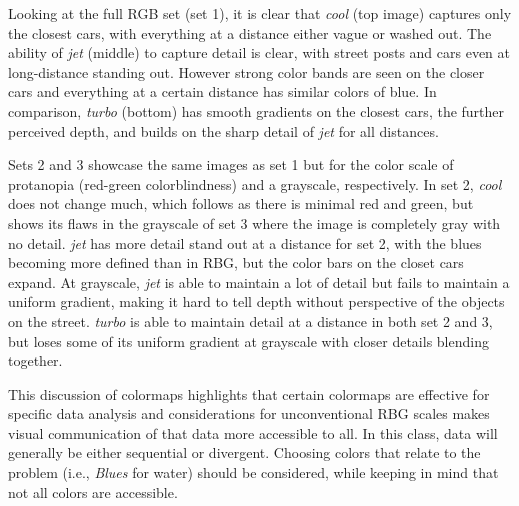 Looking at the full RGB set (set 1), it is clear that \textit{cool} (top image) captures only the closest cars, with everything at a distance either vague or washed out. The ability of \textit{jet} (middle) to capture detail is clear, with street posts and cars even at long-distance standing out. However strong color bands are seen on the closer cars and everything at a certain distance has similar colors of blue.  In comparison, \textit{turbo} (bottom) has smooth gradients on the closest cars, the further perceived depth, and builds on the sharp detail of \textit{jet} for all distances.

Sets 2 and 3 showcase the same images as set 1 but for the color scale of protanopia (red-green colorblindness) and a grayscale, respectively. In set 2, \textit{cool} does not change much, which follows as there is minimal red and green, but shows its flaws in the grayscale of set 3 where the image is completely gray with no detail.  \textit{jet} has more detail stand out at a distance for set 2, with the blues becoming more defined than in RBG, but the color bars on the closet cars expand. At grayscale, \textit{jet} is able to maintain a lot of detail but fails to maintain a uniform gradient, making it hard to tell depth without perspective of the objects on the street. \textit{turbo} is able to maintain detail at a distance in both set 2 and 3, but loses some of its uniform gradient at grayscale with closer details blending together. 

This discussion of colormaps highlights that certain colormaps are effective for specific data analysis and considerations for unconventional RBG scales makes visual communication of that data more accessible to all. In this class, data will generally be either sequential or divergent. Choosing colors that relate to the problem (i.e., \textit{Blues} for water) should be considered, while keeping in mind that not all colors are accessible. 


 


